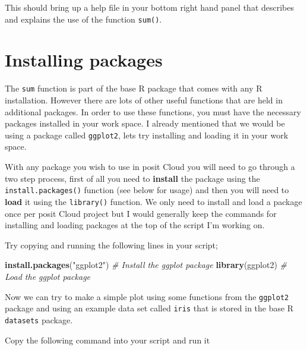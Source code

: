\documentclass[
]{book}
\newenvironment{Shaded}{\begin{snugshade}}{\end{snugshade}}
\newcommand{\CommentTok}[1]{\textcolor[rgb]{0.56,0.35,0.01}{\textit{#1}}}
\newcommand{\FunctionTok}[1]{\textcolor[rgb]{0.13,0.29,0.53}{\textbf{#1}}}
\newcommand{\NormalTok}[1]{#1}
\newcommand{\StringTok}[1]{\textcolor[rgb]{0.31,0.60,0.02}{#1}}
\begin{document}
This should bring up a help file in your bottom right hand panel that describes and explains the use of the function \texttt{sum()}.

\hypertarget{installing-packages}{%
\section{Installing packages}\label{installing-packages}}

The \texttt{sum} function is part of the base R package that comes with any R installation. However there are lots of other useful functions that are held in additional packages. In order to use these functions, you must have the necessary packages installed in your work space. I already mentioned that we would be using a package called \texttt{ggplot2}, lets try installing and loading it in your work space.

With any package you wish to use in posit Cloud you will need to go through a two step process, first of all you need to \textbf{install} the package using the \texttt{install.packages()} function (see below for usage) and then you will need to \textbf{load} it using the \texttt{library()} function. We only need to install and load a package once per posit Cloud project but I would generally keep the commands for installing and loading packages at the top of the script I'm working on.

Try copying and running the following lines in your script;

\begin{Shaded}
\begin{Highlighting}[]
\FunctionTok{install.packages}\NormalTok{(}\StringTok{"ggplot2"}\NormalTok{) }\CommentTok{\# Install the ggplot package}
\FunctionTok{library}\NormalTok{(ggplot2) }\CommentTok{\# Load the ggplot package}
\end{Highlighting}
\end{Shaded}

Now we can try to make a simple plot using some functions from the \texttt{ggplot2} package and using an example data set called \texttt{iris} that is stored in the base R \texttt{datasets} package.

Copy the following command into your script and run it
\end{document}
